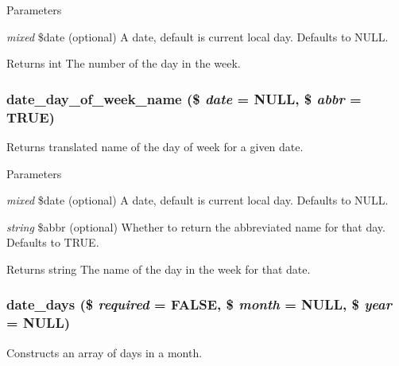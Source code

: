 \begin{DoxyParams}{Parameters}
\item[{\em mixed}]\$date (optional) A date, default is current local day. Defaults to NULL.\end{DoxyParams}
\begin{DoxyReturn}{Returns}
int The number of the day in the week. 
\end{DoxyReturn}
\hypertarget{date__api_8module_a4d08b5abdf43cc6db86eb8ea3dfdbcba}{
\subsubsection[{date\_\-day\_\-of\_\-week\_\-name}]{\setlength{\rightskip}{0pt plus 5cm}date\_\-day\_\-of\_\-week\_\-name (\$ {\em date} = {\ttfamily NULL}, \/  \$ {\em abbr} = {\ttfamily TRUE})}}
\label{date__api_8module_a4d08b5abdf43cc6db86eb8ea3dfdbcba}
Returns translated name of the day of week for a given date.


\begin{DoxyParams}{Parameters}
\item[{\em mixed}]\$date (optional) A date, default is current local day. Defaults to NULL. \item[{\em string}]\$abbr (optional) Whether to return the abbreviated name for that day. Defaults to TRUE.\end{DoxyParams}
\begin{DoxyReturn}{Returns}
string The name of the day in the week for that date. 
\end{DoxyReturn}
\hypertarget{date__api_8module_a9dba2c8bbb9dba52e15626a75f53c4b3}{
\subsubsection[{date\_\-days}]{\setlength{\rightskip}{0pt plus 5cm}date\_\-days (\$ {\em required} = {\ttfamily FALSE}, \/  \$ {\em month} = {\ttfamily NULL}, \/  \$ {\em year} = {\ttfamily NULL})}}
\label{date__api_8module_a9dba2c8bbb9dba52e15626a75f53c4b3}
Constructs an array of days in a month.


